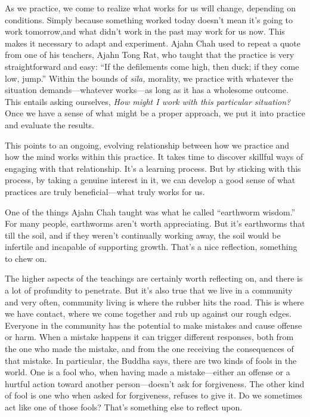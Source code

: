 As we practice, we come to realize what works for us will change, 
depending on conditions. Simply because something worked today doesn't 
mean it's going to work tomorrow,and what didn't work in the past may 
work for us now. This makes it necessary to adapt and experiment. Ajahn 
Chah used to repeat a quote from one of his teachers, Ajahn Tong Rat, 
who taught that the practice is very straightforward and easy: ``If the 
defilements come high, then duck; if they come low, jump.'' Within the 
bounds of \emph{sīla,} morality, we practice with whatever the 
situation demands---whatever works---as long as it has a wholesome 
outcome. This entails asking ourselves, \emph{How might I work with 
this particular situation?} Once we have a sense of what might be a 
proper approach, we put it into practice and evaluate the results.

This points to an ongoing, evolving relationship between how we 
practice and how the mind works within this practice. It takes time to 
discover skillful ways of engaging with that relationship. It's a 
learning process. But by sticking with this process, by taking a 
genuine interest in it, we can develop a good sense of what practices 
are truly beneficial---what truly works for us.


One of the things Ajahn Chah taught was what he called ``earthworm 
wisdom.'' For many people, earthworms aren't worth appreciating. But 
it's earthworms that till the soil, and if they weren't continually 
working away, the soil would be infertile and incapable of supporting 
growth. That's a nice reflection, something to chew on.

The higher aspects of the teachings are certainly worth reflecting on, 
and there is a lot of profundity to penetrate. But it's also true that 
we live in a community and very often, community living is where the 
rubber hits the road. This is where we have contact, where we come 
together and rub up against our rough edges. Everyone in the community 
has the potential to make mistakes and cause offense or harm. When a 
mistake happens it can trigger different responses, both from the one 
who made the mistake, and from the one receiving the consequences of 
that mistake. In particular, the Buddha says, there are two kinds of 
fools in the world. One is a fool who, when having made a 
mistake---either an offense or a hurtful action toward another 
person---doesn't ask for forgiveness. The other kind of fool is one who 
when asked for forgiveness, refuses to give it. Do we sometimes act 
like one of those fools? That's something else to reflect upon.

